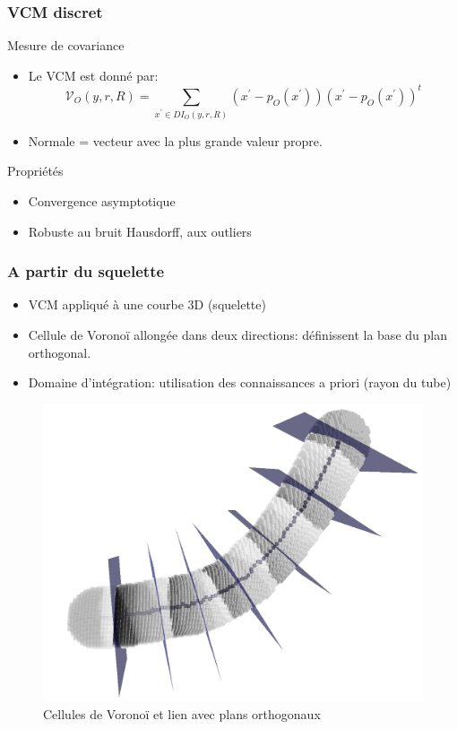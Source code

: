 \documentclass{beamer}
\begin{document}
\begin{frame}
	\frametitle{VCM discret}
	\begin{block}{Mesure de covariance}
	\begin{itemize}
		\item Le VCM est donné par: 		
		\[
			\mathcal{V}_O(y,r,R) = \sum_{x^{‎\prime} \in DI_O(y,r,R)} (x^{‎\prime} - p_O(x^{‎\prime}))(x^{‎\prime}-p_O(x^{‎\prime}))^t
		\]
		\item Normale = vecteur avec la plus grande valeur propre.
	\end{itemize}
	\end{block}
	\begin{block}{Propriétés\footnotemark}
		\begin{itemize}
			\item Convergence asymptotique
			\item Robuste au bruit Hausdorff, aux outliers
		\end{itemize}
	\end{block}
			
							
	
\end{frame}

\begin{frame}
	\frametitle{A partir du squelette}
	\begin{itemize}
		\item VCM appliqué à une courbe 3D (squelette)
		\item Cellule de Voronoï allongée dans deux directions: définissent la base du plan orthogonal.
		\item Domaine d'intégration: utilisation des connaissances a priori (rayon du tube)
	\end{itemize}
	
	\vspace{-0.5cm}	
	\begin{figure}				
		\includegraphics[clip, trim=0 3cm 0 0, scale=0.12]{fig/curvevoronoi.png}
		\caption{Cellules de Voronoï et lien avec plans orthogonaux}
	\end{figure}
		
\end{frame}
\end{document}
